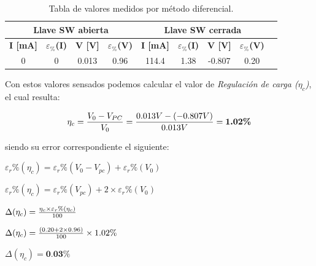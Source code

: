 \documentclass{article}
\begin{document}
\begin{table}[!hbt]
	\begin{center}

		\begin{tabular}{|c|c|c|c|c|c|c|c|c|} \hline
			\multicolumn{4}{|c|}{\textbf{Llave SW abierta}} & \multicolumn{4}{c|}{\textbf{Llave SW cerrada}} \\ \hline
			\textbf{I [mA]} & \textbf{$\varepsilon_{\%}$(I)} & \textbf{V [V]} & \textbf{$\varepsilon_{\%}$(V)} & \textbf{I [mA]} & \textbf{$\varepsilon_{\%}$(I)} & \textbf{V [V]} & \textbf{$\varepsilon_{\%}$(V)} \\\cline{1-8}
			0 & 0 & 0.013 & 0.96 & 114.4 & 1.38 & -0.807 & 0.20 \\\cline{1-8}
		\end{tabular}

	\caption{Tabla de valores medidos por método diferencial.}
	\end{center}
\end{table}
\bigskip



Con estos valores sensados podemos calcular el valor de \textit{Regulación de carga ($\eta_c$)}, el cual resulta:
\bigskip

\begin{equation}
 	\eta_c = {V_0 - V_{PC} \over V_0} = {0.013V - (-0.807V) \over 0.013V} = \textbf{1.02\%}
\end{equation}
\bigskip


\noindent siendo su error correspondiente el siguiente:
\bigskip

\begin{center}
	$\varepsilon_r\%(\eta_c) = \varepsilon_r\%(V_{0} - V_{pc}) + \varepsilon_r\%(V_{0})$ 
\end{center}
\begin{center}	
	$\varepsilon_r\%(\eta_c) = \varepsilon_r\%(V_{pc}) + 2 \times \varepsilon_r\%(V_{0})$
\end{center}	
\begin{center}	
	$\Delta(\eta_c) = {\eta_c \times \varepsilon_r\%(\eta_c) \over 100}$
\end{center}	
\begin{center}	
	$\Delta(\eta_c) = {(0.20 + 2 \times 0.96)\over 100} \times 1.02 \%$
\end{center}	
\begin{center}	
	$\Delta(\eta_c) = \textbf{0.03\%}$\\
\end{center}
\end{document}
